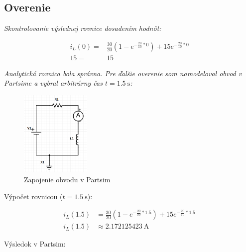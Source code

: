 \subsection{Overenie}

\textit{Skontrolovanie výslednej rovnice dosadením hodnôt:}

\begin{equation*}
\begin{aligned}
i_L(0)=&\frac{30}{20}(1-e^{-\frac{20}{10}*0})+15e^{-\frac{20}{10}*0} \\
15 =& 15
\end{aligned}
\end{equation*}

\textit{Analytická rovnica bola správna. Pre ďalšie overenie som namodeloval obvod v Partsime a vybral arbitrárny čas $t=\SI{1.5}{\second}$:}

\begin{figure}[h!]
    \centering
    \includegraphics[width=0.3\textwidth]{img/partsim.png}
    \caption{Zapojenie obvodu v Partsim}
\end{figure}

Výpočet rovnicou ($t=\SI{1.5}{\second}$):

\begin{equation*}
\begin{aligned}
i_L(1.5)&=\frac{30}{20}(1-e^{-\frac{20}{10}*1.5})+15e^{-\frac{20}{10}*1.5} \\
i_L(1.5) &\approx \SI{2.172125423}{\ampere}
\end{aligned}
\end{equation*}

\newpage

Výsledok v Partsim:

